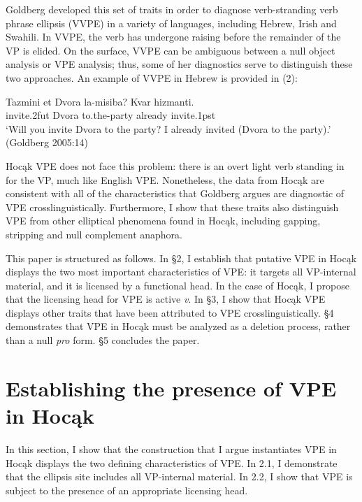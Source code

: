 \documentclass[output=paper]{LSP/langsci}
\begin{document}
Goldberg developed this set of traits in order to diagnose verb-stranding verb phrase ellipsis (VVPE) in a variety of languages, including Hebrew, Irish and Swahili. In VVPE, the verb has undergone raising before the remainder of the VP is elided. On the surface, VVPE can be ambiguous between a null object analysis or VPE analysis; thus, some of her diagnostics serve to distinguish these two approaches. An example of VVPE in Hebrew is provided in (2):

\begin{singlespacing}
\begin{exe}
\ex
\gll Tazmini {et Dvora} la-misiba? Kvar hizmanti.\\
invite.{\textsc 2fut} Dvora to.the-party already invite.{\textsc 1pst}\\
\trans `Will you invite Dvora to the party? I already invited (Dvora to the party).' \\(Goldberg 2005:14)\\
\vspace{-12pt}
\end{exe}
\end{singlespacing}

Hoc\k{a}k VPE does not face this problem: there is an overt light verb standing in for the VP, much like English VPE. Nonetheless, the data from Hoc\k{a}k are consistent with all of the characteristics that Goldberg argues are diagnostic of VPE crosslinguistically. Furthermore, I show that these traits also distinguish VPE from other elliptical phenomena found in Hoc\k{a}k, including gapping, stripping and null complement anaphora. 

This paper is structured as follows. In \S 2, I establish that putative VPE in Hoc\k{a}k displays the two most important characteristics of VPE: it targets all VP-internal material, and it is licensed by a functional head. In the case of Hoc\k{a}k, I propose that the licensing head for VPE is active \emph{v}. In \S 3, I show that Hoc\k{a}k VPE displays other traits that have been attributed to VPE crosslinguistically. \S 4 demonstrates that VPE in Hoc\k{a}k must be analyzed as a deletion process, rather than a null \emph{pro} form. \S 5 concludes the paper.

\section{Establishing the presence of VPE in Hoc\k{a}k}

In this section, I show that the construction that I argue instantiates VPE in Hoc\k{a}k displays the two defining characteristics of VPE. In 2.1, I demonstrate that the ellipsis site includes all VP-internal material. In 2.2, I show that VPE is subject to the presence of an appropriate licensing head.
\end{document}
